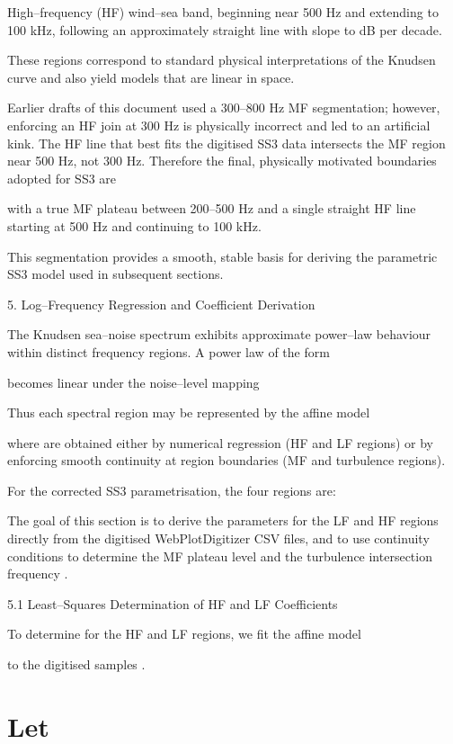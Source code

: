 \documentclass[12pt]{article}
\begin{document}
High–frequency (HF) wind–sea band, beginning near 500 Hz and extending to 100 kHz, following an approximately straight line with slope  to  dB per decade.

These regions correspond to standard physical interpretations of the Knudsen curve and also yield models that are linear in  space.

Earlier drafts of this document used a 300–800 Hz MF segmentation; however, enforcing an HF join at 300 Hz is physically incorrect and led to an artificial kink. The HF line that best fits the digitised SS3 data intersects the MF region near 500 Hz, not 300 Hz. Therefore the final, physically motivated boundaries adopted for SS3 are


with a true MF plateau between 200–500 Hz and a single straight HF line starting at 500 Hz and continuing to 100 kHz.

This segmentation provides a smooth, stable basis for deriving the parametric SS3 model used in subsequent sections.

5. Log–Frequency Regression and Coefficient Derivation

The Knudsen sea–noise spectrum exhibits approximate power–law behaviour within distinct frequency regions. A power law of the form


becomes linear under the noise–level mapping


Thus each spectral region may be represented by the affine model


where  are obtained either by numerical regression (HF and LF regions) or by enforcing smooth continuity at region boundaries (MF and turbulence regions).

For the corrected SS3 parametrisation, the four regions are:


The goal of this section is to derive the parameters  for the LF and HF regions directly from the digitised WebPlotDigitizer CSV files, and to use continuity conditions to determine the MF plateau level and the turbulence intersection frequency .

5.1 Least–Squares Determination of HF and LF Coefficients

To determine  for the HF and LF regions, we fit the affine model


to the digitised samples .

\section*{Let}
\end{document}
